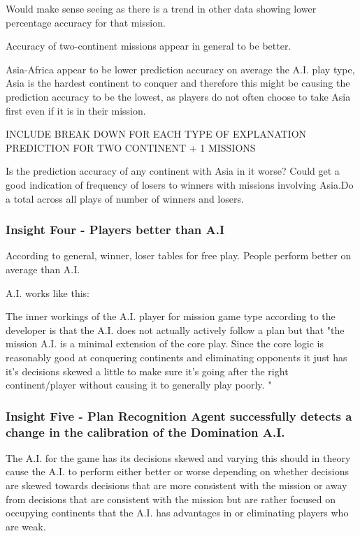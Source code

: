 \documentclass[parskip]{cs4rep}
\begin{document}
Would make sense seeing as there is a trend in other data showing lower percentage accuracy for that mission.

Accuracy of two-continent missions appear in general to be better.

Asia-Africa appear to be lower prediction accuracy on average the A.I. play type, Asia is the hardest continent to conquer and therefore this might be causing the prediction accuracy to be the lowest, as players do not often choose to take Asia first even if it is in their mission.

INCLUDE BREAK DOWN FOR EACH TYPE OF EXPLANATION PREDICTION FOR TWO CONTINENT + 1 MISSIONS

Is the prediction accuracy of any continent with Asia in it worse? Could get a good indication of frequency of losers to winners with missions involving Asia.Do a total across all plays of number of winners and losers.

\subsubsection{Insight Four - Players better than A.I}

According to general, winner, loser tables for free play. People perform better on average than A.I.

A.I. works like this: 

The inner workings of the A.I. player for mission game type according to the developer is that the A.I. does not actually actively follow a plan but that "the mission A.I. is a minimal extension of the core play. Since the core logic is reasonably good at conquering continents and eliminating opponents it just has it's decisions skewed a little to make sure it's going after the right continent/player without causing it to generally play poorly. "

\subsubsection{Insight Five - Plan Recognition Agent successfully detects a change in the calibration of the Domination A.I.}

The A.I. for the game has its decisions skewed and varying this should in theory cause the A.I. to perform either better or worse depending on whether decisions are skewed towards decisions that are more consistent with the mission or away from decisions that are consistent with the mission but are rather focused on occupying continents that the A.I. has advantages in or eliminating players who are weak.
\end{document}

